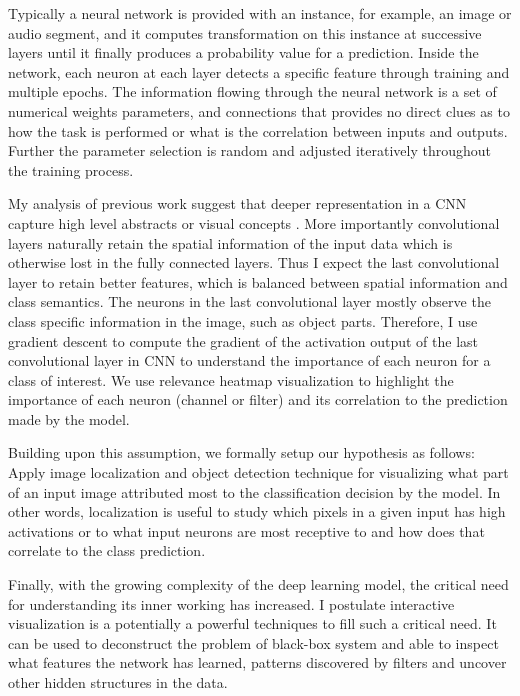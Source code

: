 Typically a neural network is provided with an instance, for example, an image or audio segment, and it computes transformation on this instance at successive layers until it finally produces a probability value for a prediction. Inside the network, each neuron at each layer detects a specific feature through training and multiple epochs. The information flowing through the neural network is a set of numerical weights parameters, and connections that provides no direct clues as to how the task is performed or what is the correlation between inputs and outputs. Further the parameter selection is random and adjusted iteratively throughout the training process.

My analysis of previous work suggest that deeper representation in a CNN capture high level abstracts or visual concepts \cite{Zeiler}. More importantly convolutional layers naturally retain the spatial information of the input data which is otherwise lost in the fully connected layers. Thus I expect the last convolutional layer to retain better features, which is balanced between spatial information and class semantics. The neurons in the last convolutional layer mostly observe the class specific information in the image, such as object parts. Therefore, I use gradient descent to compute the gradient of the activation output of the last convolutional layer in CNN to understand the importance of each neuron for a class of interest. We use relevance heatmap visualization to highlight the importance of each neuron (channel or filter) and its correlation to the prediction made by the model.

Building upon this assumption, we formally setup our hypothesis as follows: Apply image localization and object detection technique for visualizing what part of an input image attributed most to the classification decision by the model. In other words, localization is useful to study which pixels in a given input has high activations or to what input neurons are most receptive to and how does that correlate to the class prediction.

Finally, with the growing complexity of the deep learning model, the critical need for understanding its inner working has increased. I postulate interactive visualization is a potentially a powerful techniques to fill such a critical need. It can be used to deconstruct the problem of black-box system and able to inspect what features the network has learned, patterns discovered by filters and uncover other hidden structures in the data.

